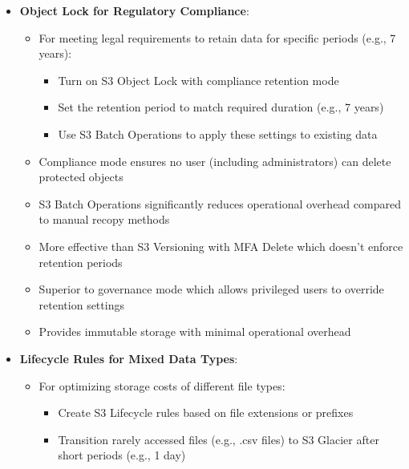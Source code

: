 \documentclass[11pt,a4paper]{report}
\begin{document}
\begin{itemize}
\begin{itemize}
  \item Better than storing logs in CloudWatch Logs which would be significantly more expensive
  \item More appropriate than using CloudWatch with S3 Lifecycle policies which adds unnecessary complexity
  \item Provides immediate access to recent logs (past month) for troubleshooting
  \item Ensures compliance with long-term retention requirements while optimizing costs
\end{itemize}
  \item \textbf{Object Lock for Regulatory Compliance}:
\begin{itemize}
  \item For meeting legal requirements to retain data for specific periods (e.g., 7 years):
\begin{itemize}
  \item Turn on S3 Object Lock with compliance retention mode
  \item Set the retention period to match required duration (e.g., 7 years)
  \item Use S3 Batch Operations to apply these settings to existing data
\end{itemize}
  \item Compliance mode ensures no user (including administrators) can delete protected objects
  \item S3 Batch Operations significantly reduces operational overhead compared to manual recopy methods
  \item More effective than S3 Versioning with MFA Delete which doesn't enforce retention periods
  \item Superior to governance mode which allows privileged users to override retention settings
  \item Provides immutable storage with minimal operational overhead
\end{itemize}
  \item \textbf{Lifecycle Rules for Mixed Data Types}:
\begin{itemize}
  \item For optimizing storage costs of different file types:
\begin{itemize}
  \item Create S3 Lifecycle rules based on file extensions or prefixes
  \item Transition rarely accessed files (e.g., .csv files) to S3 Glacier after short periods (e.g., 1 day)

\end{itemize}
\end{itemize}
\end{itemize}
\end{document}
